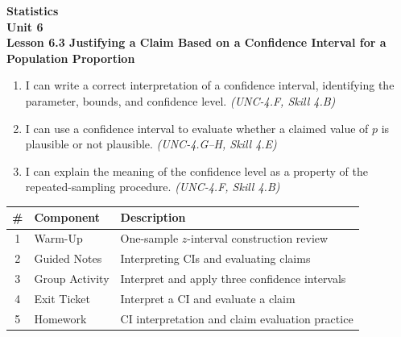 \documentclass[10pt]{article}
\begin{document}
\vspace{-0.8in}

\begin{center}
  {\color{white}\textbf{\LARGE Statistics}}\\[4pt]
  {\color{skymid}\large\textbf{Unit 6}}\\[6pt]
  {\color{white}\textbf{\large Lesson 6.3 \quad Justifying a Claim Based on a Confidence Interval for a Population Proportion}}
\end{center}

\vspace{0.22in}
\namedateperiod
\vspace{0.18in}

\begin{learningtargetbox}
\small
\begin{enumerate}[leftmargin=1.5em, itemsep=5pt]
  \item I can write a correct interpretation of a confidence interval, identifying the parameter, bounds, and confidence level. \textit{(UNC-4.F, Skill 4.B)}
  \item I can use a confidence interval to evaluate whether a claimed value of $p$ is plausible or not plausible. \textit{(UNC-4.G--H, Skill 4.E)}
  \item I can explain the meaning of the confidence level as a property of the repeated-sampling procedure. \textit{(UNC-4.F, Skill 4.B)}
\end{enumerate}
\end{learningtargetbox}

\vspace{0.14in}

\begin{tocbox}
\small
\renewcommand{\arraystretch}{1.5}
\begin{tabularx}{\linewidth}{@{} c l X @{}}
\rowcolor{sky}
\textbf{\#} & \textbf{Component} & \textbf{Description} \\
\midrule
1 & Warm-Up        & One-sample $z$-interval construction review \\
2 & Guided Notes   & Interpreting CIs and evaluating claims \\
3 & Group Activity & Interpret and apply three confidence intervals \\
4 & Exit Ticket    & Interpret a CI and evaluate a claim \\
5 & Homework       & CI interpretation and claim evaluation practice \\
\end{tabularx}
\end{tocbox}
\end{document}

